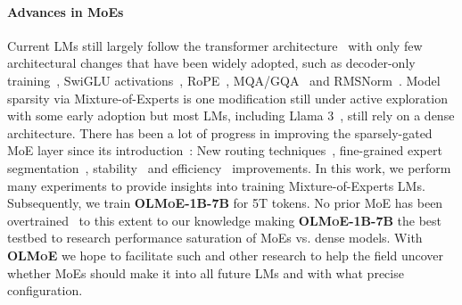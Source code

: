 \documentclass{article}
\newcommand{\model}{\textbf{\textsc{OLMoE}}}
\newcommand{\modelsmall}{\textbf{\textsc{OLMoE-1B-7B}}}
\begin{document}
\paragraph{Advances in MoEs} Current LMs still largely follow the transformer architecture~\citep{vaswani2023attention} with only few architectural changes that have been widely adopted, such as decoder-only training~\citep{radford2019language}, SwiGLU activations~\citep{shazeer2020glu,dauphin2017languagemodelinggatedconvolutional}, RoPE~\citep{su2023roformerenhancedtransformerrotary}, MQA/GQA~\citep{shazeer2019fasttransformerdecodingwritehead,ainslie2023gqatraininggeneralizedmultiquery} and RMSNorm~\citep{zhang2019rootmeansquarelayer}. Model sparsity via Mixture-of-Experts is one modification still under active exploration with some early adoption but most LMs, including Llama 3~\citep{dubey2024llama3herdmodels}, still rely on a dense architecture. There has been a lot of progress in improving the sparsely-gated MoE layer since its introduction~\citep{shazeer2017outrageously}: New routing techniques~\citep{lewis2021baselayerssimplifyingtraining,roller2021hashlayerslargesparse,zuo2022tamingsparselyactivatedtransformer,gross2017hardmixturesexpertslarge,jaszczur2021sparsescalingtransformers,dua2021trickstrainingsparsetranslation,zhong2024lory,wu2024yuan20m32mixtureexperts,muqeeth2024softmergingexpertsadaptive}, fine-grained expert segmentation~\citep{dai2024deepseekmoeultimateexpertspecialization,he2024mixturemillionexperts}, stability~\citep{zoph2022stmoe} and efficiency~\citep{lepikhin2020gshardscalinggiantmodels,rajbhandari2022deepspeedmoeadvancingmixtureofexpertsinference,du2022glam,zhou2024brainformerstradingsimplicityefficiency,li2022branchtrainmergeembarrassinglyparalleltraining,sukhbaatar2024branchtrainmixmixingexpertllms,pan2024densetrainingsparseinference,ren2023pangusigmatrillionparameterlanguage} improvements. In this work, we perform many experiments to provide insights into training Mixture-of-Experts LMs. Subsequently, we train \modelsmall{} for 5T tokens. No prior MoE has been overtrained~\citep{gadre2024language} to this extent to our knowledge making \modelsmall{} the best testbed to research performance saturation of MoEs vs. dense models. With \model{} we hope to facilitate such and other research to help the field uncover whether MoEs should make it into all future LMs and with what precise configuration.
\end{document}
